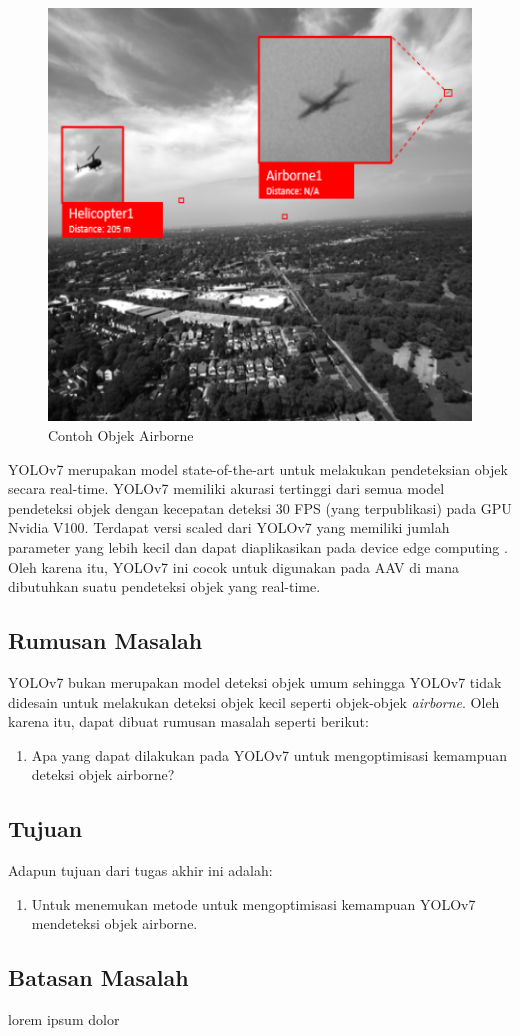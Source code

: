     \begin{figure} [ht]
        \centering
        \includegraphics[scale=0.5]{pictures/dataset-example-labeled.png}
        \caption{Contoh Objek Airborne}
        \label{fig:airborne-object-example-1}
    \end{figure}

    YOLOv7 merupakan model state-of-the-art untuk melakukan pendeteksian objek secara real-time.
    YOLOv7 memiliki akurasi tertinggi dari semua model pendeteksi objek dengan kecepatan deteksi 30 FPS (yang terpublikasi) pada GPU Nvidia V100.
    Terdapat versi scaled dari YOLOv7 yang memiliki jumlah parameter yang lebih kecil dan dapat diaplikasikan pada device edge computing \parencite{yolov7}.
    Oleh karena itu, YOLOv7 ini cocok untuk digunakan pada AAV di mana dibutuhkan suatu pendeteksi objek yang real-time.

\subsection{Rumusan Masalah}
    YOLOv7 bukan merupakan model deteksi objek umum sehingga YOLOv7 tidak didesain untuk melakukan deteksi objek kecil seperti objek-objek \emph{airborne}.
    Oleh karena itu, dapat dibuat rumusan masalah seperti berikut:
    \begin{enumerate}
        \item Apa yang dapat dilakukan pada YOLOv7 untuk mengoptimisasi kemampuan deteksi objek airborne?
    \end{enumerate}

\subsection{Tujuan}
    Adapun tujuan dari tugas akhir ini adalah:
    \begin{enumerate}
        \item Untuk menemukan metode untuk mengoptimisasi kemampuan YOLOv7 mendeteksi objek airborne.
    \end{enumerate}

\subsection{Batasan Masalah}
    lorem ipsum dolor






